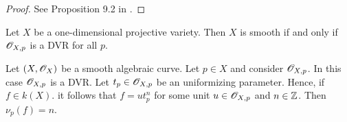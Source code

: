 \begin{proof}
	See Proposition 9.2 in \cite{atiyah}.
\end{proof}
\begin{corollary}\label{cor:smoothness-DVR-curves}
	Let $X$ be a one-dimensional projective variety. Then $X$ is smooth if and only if ${\mathscr O}_{X,p}$ is a DVR for all $p$.
\end{corollary}
\begin{example}\label{ex:stalk-of-regular-functions-as-a-DVR}
	Let $(X,{\mathscr O}_{X})$ be a smooth algebraic curve. Let $p \in X$ and consider ${\mathscr O}_{X,p}$. In this case ${\mathscr O}_{X,p}$ is a DVR. Let $t_{p}\in {\mathscr O}_{X,p}$ be an uniformizing parameter. Hence, if $f \in k(X)$. it follows that $f = ut_{p}^{n}$ for some  unit $u\in {\mathscr O}_{X,p}$ and $n \in {\mathbb Z}$. Then $\nu_{p}(f) = n$.
\end{example}




